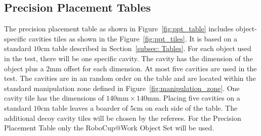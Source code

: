 \subsection{Precision Placement Tables}\label{sec:Precision Placement}

The precision placement table as shown in Figure~\ref{fig:ppt_table} includes object-specific cavities tiles as shown in the Figure~\ref{fig:ppt_tiles}. It is based on a standard $10\si{\centi\meter}$ table described in Section~\ref{subsec: Tables}. For each object used in the test, there will be one specific cavity. The cavity has the dimension of the object plus a $2 \si{\milli\meter}$ offset for each dimension. At most five cavities are used in the test. The cavities are in an random order on the table and are located within the standard manipulation zone defined in Figure~\ref{fig:manipulation_zone}. One cavity tile has the dimensions of $140 \si{\milli\meter} \times 140 \si{\milli\meter} $. Placing five cavities on a standard $10\si{\centi\meter}$ table leaves a boarder of $5 \si{\centi\meter}$ on each side of the table. The additional decoy cavity tiles will be chosen by the referees. For the Precision Placement Table only the RoboCup@Work Object Set will be used.

